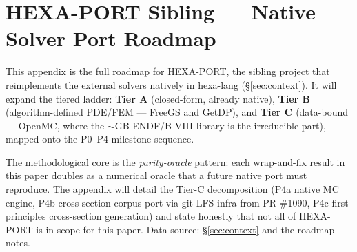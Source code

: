 \section{HEXA-PORT Sibling --- Native Solver Port Roadmap}
\label{app:hexaport}

This appendix is the full roadmap for HEXA-PORT, the sibling project
that reimplements the external solvers natively in hexa-lang
(\S\ref{sec:context}). It will expand the tiered ladder: \textbf{Tier
A} (closed-form, already native), \textbf{Tier B} (algorithm-defined
PDE/FEM --- FreeGS and GetDP), and \textbf{Tier C} (data-bound ---
OpenMC, where the $\sim$GB ENDF/B-VIII library is the irreducible
part), mapped onto the P0--P4 milestone sequence.

The methodological core is the \emph{parity-oracle} pattern: each
wrap-and-fix result in this paper doubles as a numerical oracle that a
future native port must reproduce. The appendix will detail the
Tier-C decomposition (P4a native MC engine, P4b cross-section corpus
port via git-LFS infra from PR \#1090, P4c first-principles
cross-section generation) and state honestly that not all of HEXA-PORT
is in scope for this paper. Data source: \S\ref{sec:context} and the
roadmap notes.
